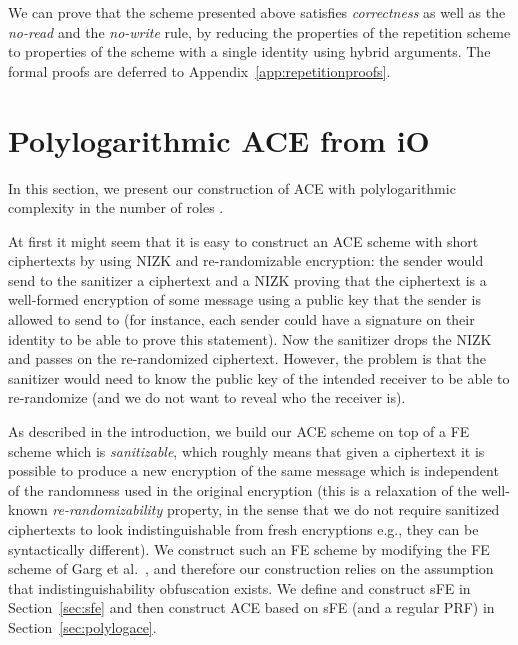 \documentclass{llncs}
\begin{document}
We can prove that the scheme presented above satisfies \emph{correctness} as well as the \emph{no-read} and the \emph{no-write} rule, by reducing the properties of the repetition scheme to properties of the scheme with a single identity using hybrid arguments. The formal proofs are deferred to Appendix~\ref{app:repetitionproofs}. 


\section{Polylogarithmic ACE from iO}\label{sec:polylog}


In this section, we present our construction of ACE with polylogarithmic complexity in the number of roles .

At first it might seem that it is easy to construct an ACE scheme with short ciphertexts by using NIZK and re-randomizable encryption: the sender would send to the sanitizer a ciphertext and a NIZK proving that the ciphertext is a well-formed encryption of some message using a public key that the sender is allowed to send to (for instance, each sender could have a signature on their identity to be able to prove this statement). Now the sanitizer drops the NIZK and passes on the re-randomized ciphertext. However, the problem is that the sanitizer would need to know the public key of the intended receiver to be able to re-randomize (and we do not want to reveal who the receiver is). 

As described in the introduction, we build our ACE scheme on top of a FE scheme which is \emph{sanitizable}, which roughly means that given a ciphertext it is possible to produce a new encryption of the same message which is independent of the randomness used in the original encryption (this is a relaxation of the well-known \emph{re-randomizability} property, in the sense that we do not require sanitized ciphertexts to look indistinguishable from fresh encryptions e.g., they can be syntactically different). We construct such an FE scheme by modifying the FE scheme of Garg et al.~\cite{DBLP:conf/focs/GargGH0SW13}, and therefore our construction relies on the assumption that indistinguishability obfuscation exists. We define and construct sFE in Section~\ref{sec:sfe} and then construct ACE based on sFE (and a regular PRF) in Section~\ref{sec:polylogace}. 
\end{document}
